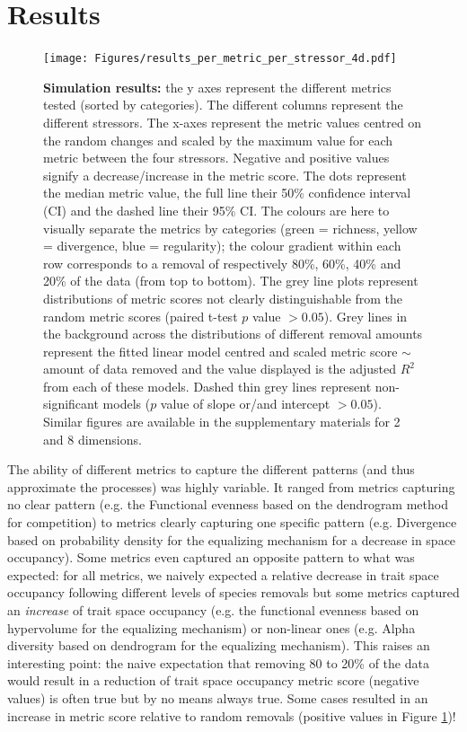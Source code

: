 \documentclass[12pt,letterpaper]{article}
\begin{document}
\section{Results}


\begin{figure}[!htbp]
\centering
   \texttt{[image: Figures/results\_per\_metric\_per\_stressor\_4d.pdf]}
\caption{\scriptsize{\textbf{Simulation results:} the y axes represent the different metrics tested (sorted by categories).
The different columns represent the different stressors. The x-axes represent the metric values centred on the random changes and scaled by the maximum value for each metric between the four stressors.
Negative and positive values signify a decrease/increase in the metric score.
The dots represent the median metric value, the full line their 50\% confidence interval (CI) and the dashed line their 95\% CI.
The colours are here to visually separate the metrics by categories (green = richness, yellow = divergence, blue = regularity); the colour gradient within each row corresponds to a removal of respectively 80\%, 60\%, 40\% and 20\% of the data (from top to bottom).
The grey line plots represent distributions of metric scores not clearly distinguishable from the random metric scores (paired t-test $p$ value $> 0.05$).
Grey lines in the background across the distributions of different removal amounts represent the fitted linear model centred and scaled metric score $\sim$ amount of data removed and the value displayed is the adjusted $R^2$ from each of these models.
Dashed thin grey lines represent non-significant models ($p$ value of slope or/and intercept $> 0.05$).
Similar figures are available in the supplementary materials for 2 and 8 dimensions.}}
\label{Fig:simulation_results}
\end{figure}
\bigskip

The ability of different metrics to capture the different patterns (and thus approximate the processes) was highly variable.
It ranged from metrics capturing no clear pattern (e.g. the Functional evenness based on the dendrogram method for competition) to metrics clearly capturing one specific pattern (e.g. Divergence based on probability density for the equalizing mechanism for a decrease in space occupancy).
Some metrics even captured an opposite pattern to what was expected: for all metrics, we naively expected a relative decrease in trait space occupancy following different levels of species removals but some metrics captured an \textit{increase} of trait space occupancy (e.g. the functional evenness based on hypervolume for the equalizing mechanism) or non-linear ones (e.g. Alpha diversity based on dendrogram for the equalizing mechanism).
This raises an interesting point: the naive expectation that removing 80 to 20\% of the data would result in a reduction of trait space occupancy metric score (negative values) is often true but by no means always true.
Some cases resulted in an increase in metric score relative to random removals (positive values in Figure \ref{Fig:simulation_results})!
\end{document}

